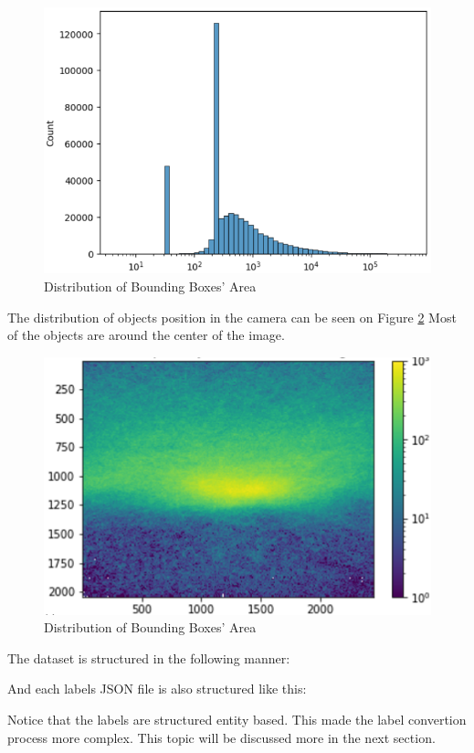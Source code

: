   \begin{figure}[H]
    \centering
    \includegraphics[width=.8\textwidth]{figures/area-dist.png}
    \caption{Distribution of Bounding Boxes' Area}
    \label{fig:areadist}
  \end{figure}

  The distribution of objects position in the camera can be seen on Figure \ref{fig:objectheatmap}
  Most of the objects are around the center of the image.

  \begin{figure}[H]
    \centering
    \includegraphics[width=.8\textwidth]{figures/object-pos-dist.png}
    \caption{Distribution of Bounding Boxes' Area \parencite{aot_docs}}
    \label{fig:objectheatmap}
  \end{figure}

  The dataset is structured in the following manner:

  
  
  And each labels JSON file is also structured like this:

  
  
  Notice that the labels are structured entity based. This made the label convertion process
  more complex. This topic will be discussed more in the next section.


